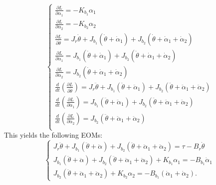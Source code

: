 \documentclass[12pt]{report}
\newcommand{\pder}[2]{\frac{\partial #1}{\partial #2}}
\begin{document}
\begin{enumerate}[Question]
{\[\begin{cases}
                      \pder{L}{\alpha_1}=-K_{b_1}\alpha_1                                                                                                                                 \\
                      \pder{L}{\alpha_2}=-K_{b_2} \alpha_2                                                                                                                                \\
                      \pder{L}{\dot{\theta}}= J_r\dot{\theta}+J_{b_1}(\dot{\theta}+\dot{\alpha}_1) + J_{b_2}(\dot{\theta}+\dot{\alpha}_1+\dot{\alpha}_2)                                  \\
                      \pder{L}{\dot{\alpha}_1} =J _{b_1}(\dot{\theta}+\dot{\alpha}_1) + J_{b_2}(\dot{\theta}+\dot{\alpha}_1+\dot{\alpha}_2)                                               \\
                      \pder{L}{\dot{\alpha}_2} =J_{b_2}(\dot{\theta}+\dot{\alpha}_1+\dot{\alpha}_2)                                                                                       \\
                      \frac{d}{dt} \left(\pder{L}{\dot{\theta}}\right) = J_r\ddot{\theta}+J_{b_1}(\ddot{\theta}+\ddot{\alpha}_1) + J_{b_2}(\ddot{\theta}+\ddot{\alpha}_1+\ddot{\alpha}_2) \\
                      \frac{d}{dt} \left(\pder{L}{\dot{\alpha}_1}\right) = J_{b_1}(\ddot{\theta}+\ddot{\alpha}_1) + J_{b_2}(\ddot{\theta}+\ddot{\alpha}_1+\ddot{\alpha}_2)                \\
                      \frac{d}{dt} \left(\pder{L}{\dot{\alpha}_2}\right) = J_{b_2}(\ddot{\theta}+\ddot{\alpha}_1+\ddot{\alpha}_2)                                                         \\
                  \end{cases}
              \]
              This yields the following EOMs:
              \[
                  \begin{cases}
                      J_r \ddot{\theta} + J_{b_1} (\ddot{\theta}+\ddot{\alpha}) + J_{b_2}(\ddot{\theta}+\ddot{\alpha}_1+\ddot{\alpha}_2) = \tau-B_r\dot{\theta}   \\
                      J_{b_1} (\ddot{\theta}+\ddot{\alpha}) + J_{b_2}(\ddot{\theta}+\ddot{\alpha}_1+\ddot{\alpha}_2) + K_{b_1} \alpha_1 = -B_{b_1} \dot{\alpha}_1 \\
                      J_{b_2}(\ddot{\theta}+\ddot{\alpha}_1+\ddot{\alpha}_2) + K_{b_2} \alpha_2 = -B_{b_1} (\dot{\alpha}_1+\dot{\alpha}_2).

\end{cases}\]}
\end{enumerate}
\end{document}
